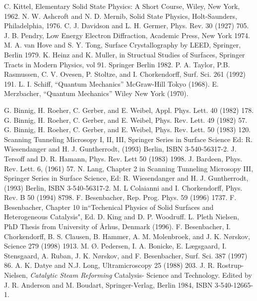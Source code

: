 \documentclass[12pt]{book}
\begin{document}
\begin{thebibliography}{99}
 C. Kittel, Elementary Solid State Physics: A Short Course, Wiley, New York, 1962.
 N. W. Ashcroft and N. D. Mernib, Solid State Physics, Holt-Saunders, Philadelphia, 1976.
  C. J. Davidson and L. H. Germer, Phys. Rev. 30 (1927) 705.
 J. B. Pendry, Low Energy Electron Diffraction, Academic Press, New York 1974.
 M. A. van Hove and  S. Y. Tong, Surface Crystallography by LEED, Springer, Berlin 1979.
 K. Heinz and K. Muller, in Structual Studies of Surfaces, Springer Tracts in Modern Physics, vol 91. Springer Berlin 1982.
 P. A. Taylor, P.B. Rasmussen, C. V. Ovesen, P. Stoltze, and I. Chorkendorff, Surf. Sci. 261 (1992) 191.
 L. I. Schiff, ``Quantum Mechanics'' McGraw-Hill Tokyo (1968).
 E. Merzbacher, ``Quantum Mechanics'' Wiley New York (1970).




 G. Binnig, H. Roeher, C. Gerber, and E. Weibel, Appl. Phys. Lett. 40 (1982) 178.
 G. Binnig, H. Roeher, C. Gerber, and E. Weibel, Phys. Rev. Lett. 49 (1982) 57.
 G. Binnig, H. Roeher, C. Gerber, and E. Weibel, Phys. Rev. Lett. 50 (1983) 120.
 Scanning Tunneling Microsopy I, II, III, Springer Series in Surface Science Ed: R. Wiesendanger and H. J. Guntherrodt,  (1993)  Berlin, ISBN 3-540-56317-2.
 J. Tersoff and D. R. Hamann, Phys. Rev. Lett 50 (1983) 1998.
 J. Bardeen, Phys. Rev. Lett. 6, (1961) 57.
 N. Lang, Chapter 2 in Scanning Tunneling Microsopy  III, Springer Series in Surface Science, Ed: R. Wiesendanger and H. J. Guntherrodt,  (1993)  Berlin, ISBN 3-540-56317-2.
 M. L Colaianni and I. Chorkendorff, Phys. Rev. B 50 (1994) 8798.
 F. Besenbacher, Rep. Prog. Phys. 59 (1996) 1737.
 F. Besenbacher, Chapter 10 in``Techenical Physics of Solid Surfaces and Heterogeneous Catalysis", Ed. D. King and  D. P. Woodruff.
 L. Pleth Nielsen, PhD Thesis from University of \AA rhus, Denmark (1996).
  F. Besenbacher, I. Chorkendorff, B. S. Clausen, B. Hammer, A. M. Molenbroek, and J. K. N\o rskov, Science 279 (1998) 1913.
 M. \O. Pedersen, I. A. Bonicke, E. L\ae gsgaard, I. Stensgaard, A. Ruban, J. K. N\o rskov, and F. Besenbacher, Surf. Sci. 387 (1997) 86.
 A. K. Datye and  N.J. Long, Ultramicroscopy 25 (1988) 203.
 J. R. Rostrup-Nielsen, {\em Catalytic Steam Reforming} Catalysis- Science and Technology. Edited by J. R. Anderson and M. Boudart, Springer-Verlag, Berlin 1984, ISBN 3-540-12665-1.


\end{thebibliography}
\end{document}
